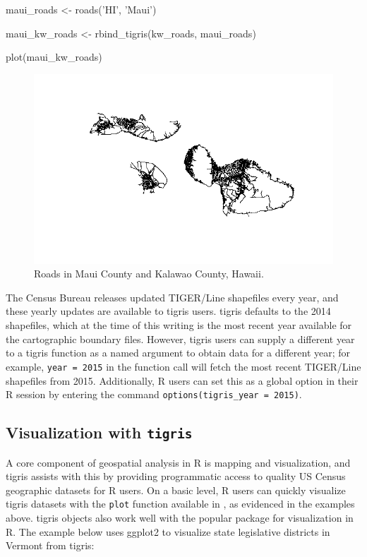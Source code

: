 \begin{Schunk}
\begin{Sinput}
maui_roads <- roads('HI', 'Maui')

maui_kw_roads <- rbind_tigris(kw_roads, maui_roads)

plot(maui_kw_roads)
\end{Sinput}
\end{Schunk}

\begin{figure}[htbp]
  \centering
  \includegraphics[width=\textwidth]{maui_kw}
  \caption{Roads in Maui County and Kalawao County, Hawaii.}
  \label{figure:maui_kw}
\end{figure}

The Census Bureau releases updated TIGER/Line shapefiles every year, and
these yearly updates are available to tigris users. tigris defaults to
the 2014 shapefiles, which at the time of this writing is the most
recent year available for the cartographic boundary files. However,
tigris users can supply a different year to a tigris function as a named
argument to obtain data for a different year; for example,
\texttt{year\ =\ 2015} in the function call will fetch the most recent
TIGER/Line shapefiles from 2015. Additionally, R users can set this as a
global option in their R session by entering the command
\texttt{options(tigris\_year\ =\ 2015)}.

\subsection{\texorpdfstring{Visualization with
\texttt{tigris}}{Visualization with tigris}}\label{visualization-with-tigris}

A core component of geospatial analysis in R is mapping and
visualization, and tigris assists with this by providing programmatic
access to quality US Census geographic datasets for R users. On a basic
level, R users can quickly visualize tigris datasets with the
\texttt{plot} function available in , as evidenced in the
examples above. tigris objects also work well with the popular
 package for visualization in R. The example below uses
ggplot2 to visualize state legislative districts in Vermont from tigris:

